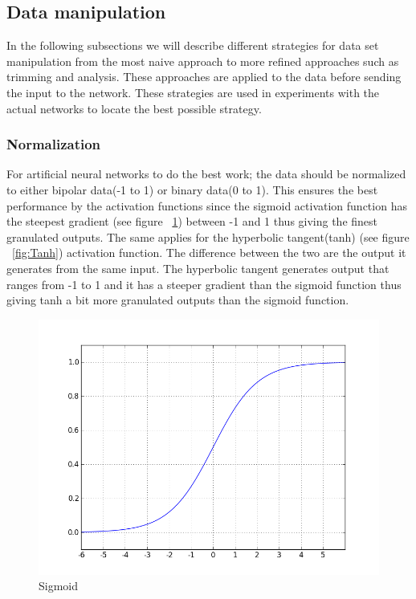 \subsection{Data manipulation}
In the following subsections we will describe different strategies for data set manipulation from the most naive approach to more refined approaches such as trimming and analysis. These approaches are applied to the data before sending the input to the network. These strategies are used in experiments with the actual networks to locate the best possible strategy.

\subsubsection{Normalization}
For artificial neural networks to do the best work; the data should be normalized to either bipolar data(-1 to 1) or binary data(0 to 1). This ensures the best performance by the activation functions since the sigmoid activation function has the steepest gradient (see figure ~\ref{fig:Sigmoid}) between -1 and 1 thus giving the finest granulated outputs. The same applies for the hyperbolic tangent(tanh) (see figure ~\ref{fig:Tanh}) activation function. The difference between the two are the output it generates from the same input. The hyperbolic tangent generates output that ranges from -1 to 1 and it has a steeper gradient than the sigmoid function thus giving tanh a bit more granulated outputs than the sigmoid function.
\begin{figure}[H]
\centering
\includegraphics[width=0.8\linewidth,natwidth=898,natheight=587]{billeder/activationFunctions/sigmoid.png}
\caption{Sigmoid}
\label{fig:Sigmoid}
\end{figure}

